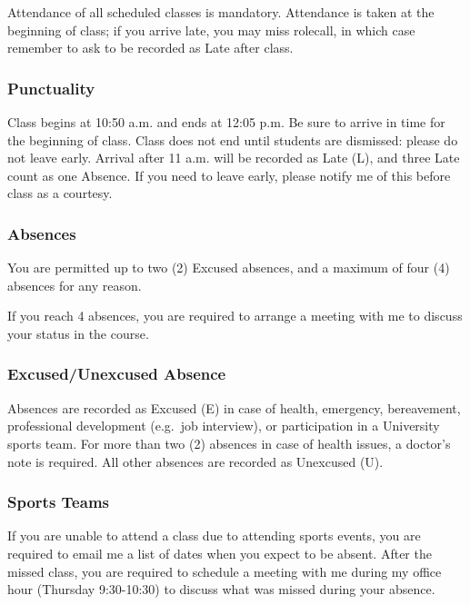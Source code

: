 \documentclass[
  letterpaper,
  DIV=11,
  numbers=noendperiod,
  oneside]{scrartcl}
\begin{document}
Attendance of all scheduled classes is mandatory. Attendance is taken at
the beginning of class; if you arrive late, you may miss rolecall, in
which case remember to ask to be recorded as Late after class.

\subsubsection{Punctuality}\label{punctuality}

Class begins at 10:50 a.m. and ends at 12:05 p.m. Be sure to arrive in
time for the beginning of class. Class does not end until students are
dismissed: please do not leave early. Arrival after 11 a.m. will be
recorded as Late (L), and three Late count as one Absence. If you need
to leave early, please notify me of this before class as a courtesy.

\subsubsection{Absences}\label{absences}

You are permitted up to two (2) Excused absences, and a maximum of four
(4) absences for any reason.

If you reach 4 absences, you are required to arrange a meeting with me
to discuss your status in the course.

\subsubsection{Excused/Unexcused
Absence}\label{excusedunexcused-absence}

Absences are recorded as Excused (E) in case of health, emergency,
bereavement, professional development (e.g.~job interview), or
participation in a University sports team. For more than two (2)
absences in case of health issues, a doctor's note is required. All
other absences are recorded as Unexcused (U).

\subsubsection{Sports Teams}\label{sports-teams}

If you are unable to attend a class due to attending sports events, you
are required to email me a list of dates when you expect to be absent.
After the missed class, you are required to schedule a meeting with me
during my office hour (Thursday 9:30-10:30) to discuss what was missed
during your absence.
\end{document}
